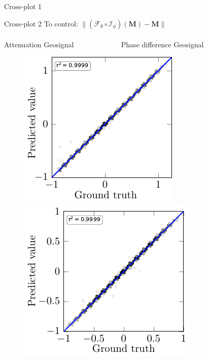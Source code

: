 \begin{frame}{Cross-plot 1}
\begin{figure}[!h]
\end{figure}
\end{frame}
\begin{frame}{Cross-plot 2}
\centering
\setlength{\fboxrule}{0.5mm}
\setlength{\fboxsep}{1mm}
\color{red}
\color{black}
To control: $\|(\mathcal{F}_{\theta} \circ \mathcal{I}_{\phi})(\mathbf{M})-\mathbf{M}\|$ \hspace{1cm}  \\
$\qquad$ \\
\hspace{0.8cm} Attenuation Geosignal $\qquad \qquad \qquad$ Phase difference Geosignal
\begin{figure}[!h]
\centering
	{%
		\includegraphics[scale=0.9]{Diapos/DL_For_Inv/Figures/Syn_example/Cross_plots/C_P_2/Atten-Geosignal_FI_axis.pdf}
		\hspace{2cm}
		\includegraphics[trim=0cm 0cm 0.3cm 0.25cm, scale=0.9]{Diapos/DL_For_Inv/Figures/Syn_example/Cross_plots/C_P_2/Phase-Geosignal_FI_axis.pdf}}
\end{figure}	
\end{frame}
